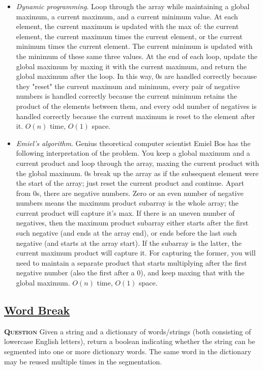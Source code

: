 \documentclass[table, xcdraw]{article}%
\begin{document}
\begin{itemize}
    \item \textit{Dynamic programming}. Loop through the array while maintaining a global maximum, a current maximum, and a current minimum value. At each element, the current maximum is updated with the max of: the current element, the current maximum times the current element, or the current minimum times the current element. The current minimum is updated with the minimum of these same three values. At the end of each loop, update the global maximum by maxing it with the current maximum, and return the global maximum after the loop. In this way, 0s are handled correctly because they "reset" the current maximum and minimum, every pair of negative numbers is handled correctly because the current minimum retains the product of the elements between them, and every odd number of negatives is handled correctly because the current maximum is reset to the element after it. $O(n)$ time, $O(1)$ space.
    \item \textit{Emiel's algorithm}. Genius theoretical computer scientist Emiel Bos has the following interpretation of the problem. You keep a global maximum and a current product and loop through the array, maxing the current product with the global maximum. 0s break up the array as if the subsequent element were the start of the array; just reset the current product and continue. Apart from 0s, there are negative numbers. Zero or an even number of negative numbers means the maximum product subarray is the whole array; the current product will capture it's max. If there is an uneven number of negatives, then the maximum product subarray either starts after the first such negative (and ends at the array end), or ends before the last such negative (and starts at the array start). If the subarray is the latter, the current maximum product will capture it. For capturing the former, you will need to maintain a separate product that starts multiplying after the first negative number (also the first after a 0), and keep maxing that with the global maximum. $O(n)$ time, $O(1)$ space.
\end{itemize}

\subsection{\href{https://leetcode.com/problems/word-break}{Word Break}}

\textsc{\textbf{Question}} Given a string and a dictionary of words/strings (both consisting of lowercase English letters), return a boolean indicating whether the string can be segmented into one or more dictionary words. The same word in the dictionary may be reused multiple times in the segmentation.
\end{document}
